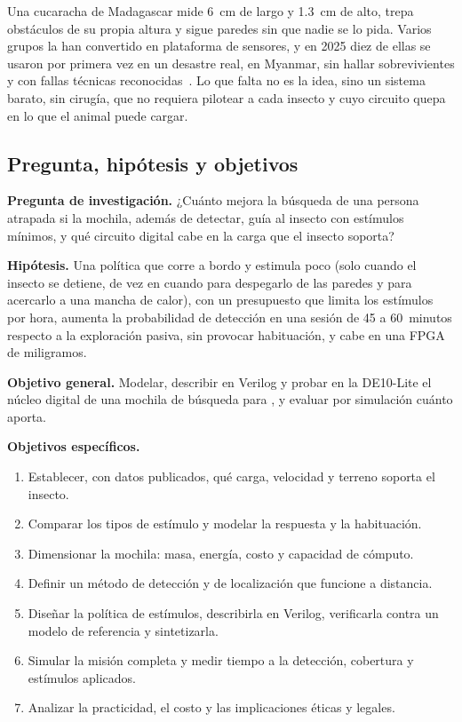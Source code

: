 Una cucaracha de Madagascar mide 6~cm de largo y 1.3~cm de alto, trepa obstáculos de su
propia altura y sigue paredes sin que nadie se lo pida. Varios grupos la han convertido
en plataforma de sensores, y en 2025 diez de ellas se usaron por primera vez en un
desastre real, en Myanmar, sin hallar sobrevivientes y con fallas técnicas
reconocidas~\cite{htx2025}. Lo que falta no es la idea, sino un sistema barato, sin cirugía,
que no requiera pilotear a cada insecto y cuyo circuito quepa en lo que el animal puede cargar.

\subsection{Pregunta, hipótesis y objetivos}

\begin{infobox}
\textbf{Pregunta de investigación.} ¿Cuánto mejora la búsqueda de una persona atrapada si
la mochila, además de detectar, guía al insecto con estímulos mínimos, y qué circuito digital
cabe en la carga que el insecto soporta?
\end{infobox}

\textbf{Hipótesis.} Una política que corre a bordo y estimula poco (solo cuando el insecto
se detiene, de vez en cuando para despegarlo de las paredes y para acercarlo a una mancha
de calor), con un presupuesto que limita los estímulos por hora, aumenta la probabilidad de
detección en una sesión de 45 a 60~minutos respecto a la exploración pasiva, sin provocar
habituación, y cabe en una FPGA de miligramos.

\textbf{Objetivo general.} Modelar, describir en Verilog y probar en la DE10-Lite el núcleo
digital de una mochila de búsqueda para \Gp{}, y evaluar por simulación cuánto aporta.

\textbf{Objetivos específicos.}
\begin{enumerate}
  \item Establecer, con datos publicados, qué carga, velocidad y terreno soporta el insecto.
  \item Comparar los tipos de estímulo y modelar la respuesta y la habituación.
  \item Dimensionar la mochila: masa, energía, costo y capacidad de cómputo.
  \item Definir un método de detección y de localización que funcione a distancia.
  \item Diseñar la política de estímulos, describirla en Verilog, verificarla contra un modelo
        de referencia y sintetizarla.
  \item Simular la misión completa y medir tiempo a la detección, cobertura y estímulos aplicados.
  \item Analizar la practicidad, el costo y las implicaciones éticas y legales.
\end{enumerate}

